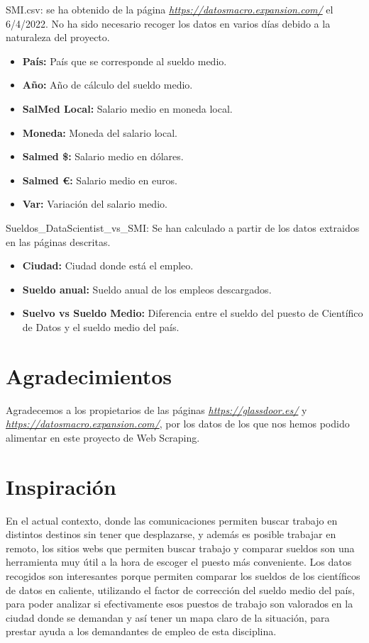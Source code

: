 \documentclass[IB]{PlantillaPACnova_Est}
\begin{document}
SMI.csv: se ha obtenido de la página  \textit{\url{https://datosmacro.expansion.com/}} el 6/4/2022. No ha sido necesario recoger los datos en varios días debido a la naturaleza del proyecto.
\begin{itemize}
\item \textbf{País: }País que se corresponde al sueldo medio.
\item \textbf{Año: }Año de cálculo del sueldo medio.
\item \textbf{SalMed Local: }Salario medio en moneda local.
\item \textbf{Moneda:} Moneda del salario local.
\item \textbf{Salmed \$:} Salario medio en dólares.
\item \textbf{Salmed €:} Salario medio en euros.
\item \textbf{Var:} Variación del salario medio.
\end{itemize}
\newpage
Sueldos\_DataScientist\_vs\_SMI: Se han calculado a partir de los datos extraidos en las páginas descritas.
\begin{itemize}
\item \textbf{Ciudad:}  Ciudad donde está el empleo.
\item \textbf{Sueldo anual:} Sueldo anual de los empleos descargados.
\item \textbf{Suelvo vs Sueldo Medio: }Diferencia entre el sueldo del puesto de Científico de Datos y el sueldo medio del país.
\end{itemize}

\section{Agradecimientos}

Agradecemos a los propietarios de las páginas  \textit{\url{https://glassdoor.es/}} y \textit{ \url{https://datosmacro.expansion.com/}}, por los datos de los que nos hemos podido alimentar en este proyecto de Web Scraping. 

\section{Inspiración}

En el actual contexto, donde las comunicaciones permiten buscar trabajo en distintos destinos sin tener que desplazarse, y además es posible trabajar en remoto, los sitios webs que permiten buscar trabajo y comparar sueldos son una herramienta muy útil a la hora de escoger el puesto más conveniente. Los datos recogidos son interesantes porque permiten comparar los sueldos de los científicos de datos en caliente, utilizando el factor de corrección del sueldo medio del país, para poder analizar si efectivamente esos puestos de trabajo son valorados en la ciudad donde se demandan y así tener un mapa claro de la situación, para prestar ayuda a los demandantes de empleo de esta disciplina. 
\end{document}
